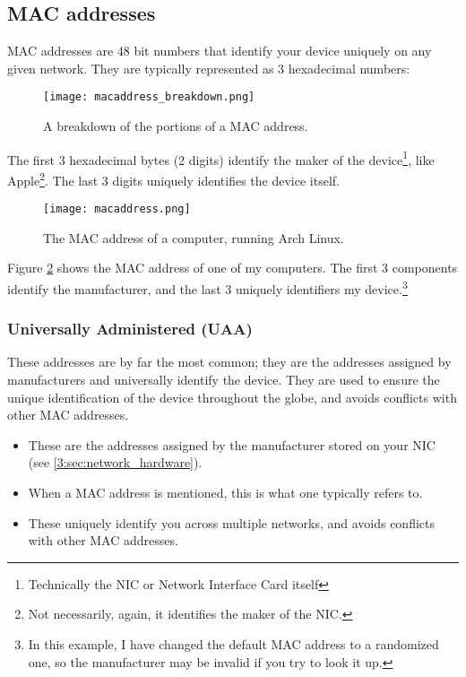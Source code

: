\documentclass[../main.tex]{subfiles}
\begin{document}
\subsection{MAC addresses}
\label{2:sec:mac}

MAC addresses are 48 bit numbers that identify your device uniquely on any given network. They are typically represented as 3 hexadecimal numbers:

\begin{figure}[ht]
    \centering
    \texttt{[image: macaddress\_breakdown.png]}
    \caption{A breakdown of the portions of a MAC address.}
    \label{fig:macaddress_breakdown}
\end{figure}

The first 3 hexadecimal bytes (2 digits) identify the maker of the device\footnote{Technically the NIC or Network Interface Card itself}, like Apple\footnote{Not necessarily, again, it identifies the maker of the NIC.}. The last 3 digits uniquely identifies the device itself.

\begin{figure}[ht]
    \centering
    \texttt{[image: macaddress.png]}
    \caption{The MAC address of a computer, running Arch Linux.}
    \label{fig:macaddress}
\end{figure}

Figure \ref{fig:macaddress} shows the MAC address of one of my computers. The first 3 components identify the manufacturer, and the last 3 uniquely identifiers my device.\footnote{In this example, I have changed the default MAC address to a randomized one, so the manufacturer may be invalid if you try to look it up.}

\subsubsection{Universally Administered (UAA)}

These addresses are by far the most common; they are the addresses assigned by manufacturers and universally identify the device. They are used to ensure the unique identification of the device throughout the globe, and avoids conflicts with other MAC addresses.

\begin{itemize}
    \item These are the addresses assigned by the manufacturer stored on your NIC (see \ref{3:sec:network_hardware}).
    \item When a MAC address is mentioned, this is what one typically refers to.
    \item These uniquely identify you across multiple networks, and avoids conflicts with other MAC addresses.
\end{itemize}
\end{document}

